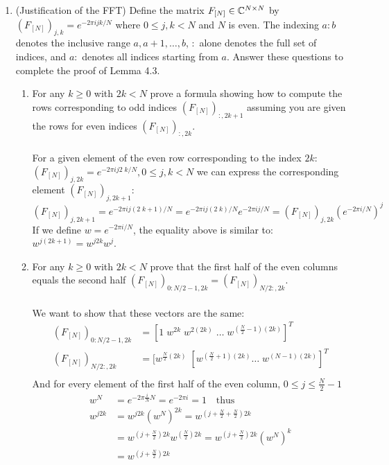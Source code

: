 \documentclass[12pt,twoside]{article}
\begin{document}
\begin{enumerate}
\begin{enumerate}
  \end{enumerate}

\newpage
\item (Justification of the FFT) Define the matrix
  $F_{[N]}\in\mathbb{C}^{N\times N}$ by
  $(F_{[N]})_{j,k}=e^{-2\pi i jk/N}$ where $0\leq j,k<N$ and $N$ is even.
  The indexing $a:b$ denotes the
  inclusive range $a,a+1,\ldots,b$, $:$ alone denotes the
  full set of indices, and $a:$ denotes all indices starting from $a$. Answer these questions to complete the proof of Lemma 4.3.
  \begin{enumerate}
  \item For any $k\geq 0$ with $2k<N$ prove a formula showing how to
    compute the rows corresponding to odd indices $(F_{[N]})_{:,2k+1}$ assuming you are given the rows for even indices $(F_{[N]})_{:,2k}$.\\ \\
    For a given element of the even row corresponding to the index $2k$: $(F_{[N]})_{j,2k}=e^{-2\pi i j 2\; k/N}, 0\leq j,k<N$ we can express the corresponding
    element $(F_{[N]})_{j,2k+1}$:
    $$
    	(F_{[N]})_{j,2k+1}=e^{-2\pi i j (2\; k + 1)/N} = e^{-2\pi i j (2\; k)/N} e^{-2\pi i j/N}  = (F_{[N]})_{j,2k} (e^{-2\pi i /N})^j
    $$
    If we define $w = e^{-2\pi i /N}$, the equality above is similar to: $w^{j (2k + 1)} = w^{j 2k} w^j$.
    
  \item For any $k\geq 0$ with $2k<N$ prove that the first half of the even columns equals the second half $(F_{[N]})_{0:N/2-1,2k}=(F_{[N]})_{N/2:,2k}$.  \\ \\
  We want to show that these vectors are the same:
  \begin{align*}
  	(F_{[N]})_{0:N/2-1,2k}	&= [1 \; w^{2k} \; w^{2 (2k)} \; \ldots \; w^{(\frac{N}{2} -1) (2k)} ]^T \\
  	(F_{[N]})_{N/2:,2k}		&= [w^{\frac{N}{2} (2k)}  \; [w^{(\frac{N}{2} + 1) (2k)}  \ldots \; w^{(N -1) (2k)} ]^T \\
  \end{align*}
  And for every element of the first half of the even column, $0 \le j \le \frac{N}{2}-1$
  \begin{align*}
  	w^N		&=	 e^{-2\pi \frac{i}{N} N} = e^{-2\pi i} = 1 \text{ ~ thus }\\ 	
  	w^{j 2k} 	&=	w^{j 2k} (w^N)^{2k} = w^{ (j +  \frac{N}{2} +  \frac{N}{2}) 2k} \\
			&= 	w^{ (j +  \frac{N}{2}) 2k} w^{(\frac{N}{2}) 2k} = w^{ (j +  \frac{N}{2}) 2k} (w^N)^k\\
			&= 	 w^{ (j +  \frac{N}{2}) 2k}
  \end{align*}
    

\end{enumerate}
\end{enumerate}
\end{document}
